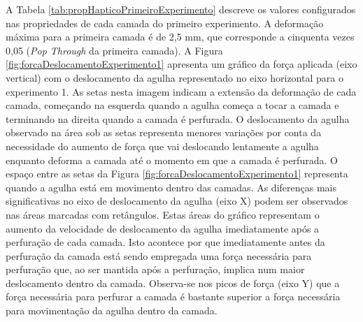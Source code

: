 A Tabela \ref{tab:propHapticoPrimeiroExperimento} descreve os valores configurados nas propriedades de cada camada do primeiro experimento. A deformação máxima para a primeira camada é de 2,5 mm, que corresponde a cinquenta vezes 0,05 (\textit{Pop Through} da primeira camada). A Figura \ref{fig:forcaDeslocamentoExperimento1} apresenta um gráfico da força aplicada (eixo vertical) com o deslocamento da agulha representado no eixo horizontal para o experimento 1. As setas nesta imagem indicam a extensão da deformação de cada camada, começando na esquerda quando a agulha começa a tocar a camada e terminando na direita quando a camada é perfurada. O deslocamento da agulha observado na área sob as setas representa menores variações por conta da necessidade do aumento de força que vai deslocando lentamente a agulha enquanto deforma a camada até o momento em que a camada é perfurada. O espaço entre as setas da Figura \ref{fig:forcaDeslocamentoExperimento1} representa quando a agulha está em movimento dentro das camadas. 
As diferenças mais significativas no eixo de deslocamento da agulha (eixo X) podem ser observados nas áreas marcadas com retângulos. Estas áreas do gráfico representam o aumento da velocidade de deslocamento da agulha imediatamente após a perfuração de cada camada. Isto acontece por que imediatamente antes da perfuração da camada está sendo empregada uma força necessária para perfuração que, ao ser mantida após a perfuração, implica num maior deslocamento dentro da camada. Observa-se nos picos de força (eixo Y) que a força necessária para perfurar a camada é bastante superior a força necessária para movimentação da agulha dentro da camada. 

